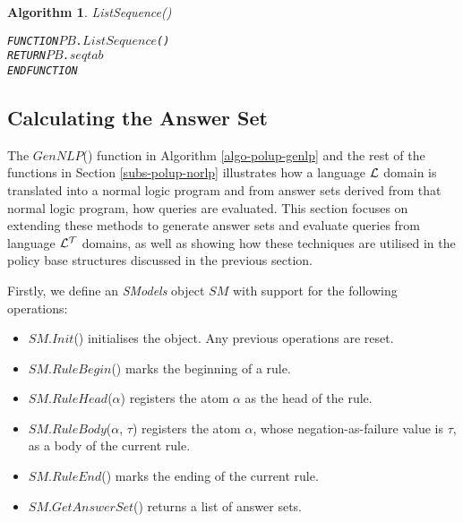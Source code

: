 \documentclass[11pt]{report}
\newenvironment{vverbatim}
{
  \begin{alltt}
}
{
    \vspace{-\baselineskip}
  \end{alltt}
}
\newtheorem{vvalgorithm}{Algorithm}[chapter]
\newenvironment{valgorithm}[2]
{
  \begin{vvalgorithm}{#1}
    \label{#2}
    \small
    \begin{vverbatim}
}
{
    \end{vverbatim}
  \end{vvalgorithm}
}
\begin{document}
          \begin{valgorithm}{ListSequence()}{algo-impln-lsseq}
FUNCTION \(PB\).\(ListSequence\)(\(\))
  RETURN \(PB\).\(seqtab\)
ENDFUNCTION
          \end{valgorithm}

      \subsection{Calculating the Answer Set}

        The $GenNLP$() function in Algorithm \ref{algo-polup-genlp} and the
        rest of the functions in Section \ref{subs-polup-norlp} illustrates
        how a language ${\cal L}$ domain is translated into a normal logic
        program and from answer sets derived from that normal logic program,
        how queries are evaluated. This section focuses on extending these
        methods to generate answer sets and evaluate queries from language
        ${\cal L^T}$ domains, as well as showing how these techniques are
        utilised in the policy base structures discussed in the previous
        section.

        Firstly, we define an {\em SModels} object $SM$ with support for the
        following operations:

        \begin{itemize}
          \item
            $SM$.$Init$() initialises the object. Any previous operations are
            reset.

          \item
            $SM$.$RuleBegin$() marks the beginning of a rule.

          \item
            $SM$.$RuleHead$($\alpha$) registers the atom $\alpha$ as the
            head of the rule.

          \item
            $SM$.$RuleBody$($\alpha$, $\tau$) registers the atom $\alpha$,
            whose negation-as-failure value is $\tau$, as a body of the
            current rule.

          \item
            $SM$.$RuleEnd$() marks the ending of the current rule.

          \item
            $SM$.$GetAnswerSet$() returns a list of answer sets.
        \end{itemize}
\end{document}
